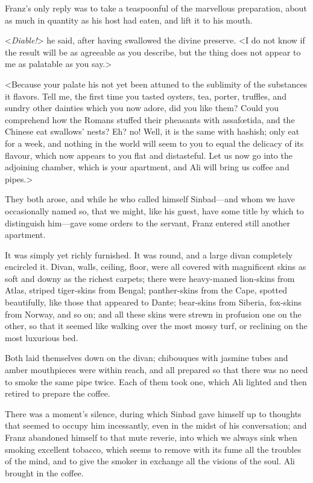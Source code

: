  Franz's only reply was to take a teaspoonful of the marvellous preparation, about as much in quantity as his host had eaten, and lift it to his mouth. 

 <\textit{Diable!}> he said, after having swallowed the divine preserve. <I do not know if the result will be as agreeable as you describe, but the thing does not appear to me as palatable as you say.> 

 <Because your palate his not yet been attuned to the sublimity of the substances it flavors. Tell me, the first time you tasted oysters, tea, porter, truffles, and sundry other dainties which you now adore, did you like them? Could you comprehend how the Romans stuffed their pheasants with assafœtida, and the Chinese eat swallows' nests? Eh? no! Well, it is the same with hashish; only eat for a week, and nothing in the world will seem to you to equal the delicacy of its flavour, which now appears to you flat and distasteful. Let us now go into the adjoining chamber, which is your apartment, and Ali will bring us coffee and pipes.> 

 They both arose, and while he who called himself Sinbad—and whom we have occasionally named so, that we might, like his guest, have some title by which to distinguish him—gave some orders to the servant, Franz entered still another apartment. 

 It was simply yet richly furnished. It was round, and a large divan completely encircled it. Divan, walls, ceiling, floor, were all covered with magnificent skins as soft and downy as the richest carpets; there were heavy-maned lion-skins from Atlas, striped tiger-skins from Bengal; panther-skins from the Cape, spotted beautifully, like those that appeared to Dante; bear-skins from Siberia, fox-skins from Norway, and so on; and all these skins were strewn in profusion one on the other, so that it seemed like walking over the most mossy turf, or reclining on the most luxurious bed. 

 Both laid themselves down on the divan; chibouques with jasmine tubes and amber mouthpieces were within reach, and all prepared so that there was no need to smoke the same pipe twice. Each of them took one, which Ali lighted and then retired to prepare the coffee. 

 There was a moment's silence, during which Sinbad gave himself up to thoughts that seemed to occupy him incessantly, even in the midst of his conversation; and Franz abandoned himself to that mute reverie, into which we always sink when smoking excellent tobacco, which seems to remove with its fume all the troubles of the mind, and to give the smoker in exchange all the visions of the soul. Ali brought in the coffee. 

